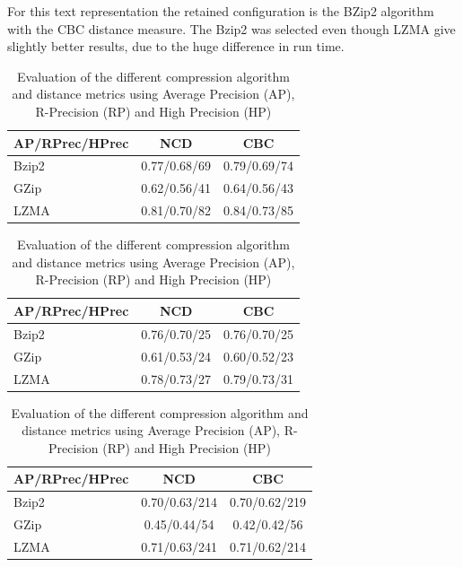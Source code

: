 For this text representation the retained configuration is the BZip2 algorithm with the CBC distance measure.
The Bzip2 was selected even though LZMA give slightly better results, due to the huge difference in run time.

\begin{table}
  \centering
  \caption{Evaluation of the different compression algorithm and distance metrics using Average Precision (AP), R-Precision (RP) and High Precision (HP)}
  \label{tab:compression_evaluation_results}

  \label{tab:compression_evaluation_oxquarry}
  \begin{tabular}{l c c}
    \toprule
    AP/RPrec/HPrec & NCD          & CBC \\
    \midrule
    Bzip2          & 0.77/0.68/69 & 0.79/0.69/74 \\
    GZip           & 0.62/0.56/41 & 0.64/0.56/43 \\
    LZMA           & 0.81/0.70/82 & 0.84/0.73/85 \\
    \bottomrule
  \end{tabular}

  \label{tab:compression_evaluation_brunet}
  \begin{tabular}{l c c}
    \toprule
    AP/RPrec/HPrec & NCD          & CBC \\
    \midrule
    Bzip2          & 0.76/0.70/25 & 0.76/0.70/25 \\
    GZip           & 0.61/0.53/24 & 0.60/0.52/23 \\
    LZMA           & 0.78/0.73/27 & 0.79/0.73/31 \\
    \bottomrule
  \end{tabular}

  \label{tab:compression_evaluation_st_jean}
  \begin{tabular}{l c c}
    \toprule
    AP/RPrec/HPrec & NCD           & CBC \\
    \midrule
    Bzip2          & 0.70/0.63/214 & 0.70/0.62/219 \\
    GZip           & 0.45/0.44/54  & 0.42/0.42/56 \\
    LZMA           & 0.71/0.63/241 & 0.71/0.62/214 \\
    \bottomrule
  \end{tabular}
\end{table}

